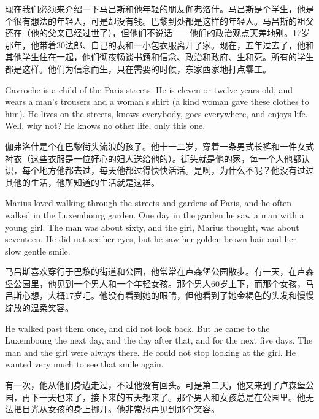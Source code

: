 \documentclass[fontset=ubuntu, zihao=5]{ctexart}
\begin{document}
\begin{paracol}{2}
\switchcolumn

现在我们必须来介绍一下马吕斯和他年轻的朋友伽弗洛什。马吕斯是个学生，他是个很有想法的年轻人，可是却没有钱。巴黎到处都是这样的年轻人。马吕斯的祖父还在（他的父亲已经过世了），但他们不说话——他们的政治观点天差地别。17岁那年，他带着30法郎、自己的表和一小包衣服离开了家。现在，五年过去了，他和其他学生住在一起，他们彻夜畅谈书籍和信念、政治和政府、生和死。所有的学生都是这样。他们为信念而生，只在需要的时候，东家西家地打点零工。

\switchcolumn*

Gavroche is a child of the Paris streets. He is eleven or twelve years old, and wears a man's trousers and a woman's shirt (a kind woman gave these clothes to him). He lives on the streets, knows everybody, goes everywhere, and enjoys life. Well, why not? He knows no other life, only this one.

\switchcolumn

伽弗洛什是个在巴黎街头流浪的孩子。他十一二岁，穿着一条男式长裤和一件女式衬衣（这些衣服是一位好心的妇人送给他的）。街头就是他的家，每一个人他都认识，每个地方他都去过，每天他都过得快快活活。是啊，为什么不呢？他没有过过其他的生活，他所知道的生活就是这样。

\switchcolumn*

\sectionbreak

Marius loved walking through the streets and gardens of Paris, and he often walked in the Luxembourg garden. One day in the garden he saw a man with a young girl. The man was about sixty, and the girl, Marius thought, was about seventeen. He did not see her eyes, but he saw her golden-brown hair and her slow gentle smile.

\switchcolumn

\sectionbreak

马吕斯喜欢穿行于巴黎的街道和公园，他常常在卢森堡公园散步。有一天，在卢森堡公园里，他见到一个男人和一个年轻女孩。那个男人60岁上下，而那个女孩，马吕斯心想，大概17岁吧。他没有看到她的眼睛，但他看到了她金褐色的头发和慢慢绽放的温柔笑容。

\switchcolumn*

He walked past them once, and did not look back. But he came to the Luxembourg the next day, and the day after that, and for the next five days. The man and the girl were always there. He could not stop looking at the girl. He wanted very much to see that smile again.

\switchcolumn

有一次，他从他们身边走过，不过他没有回头。可是第二天，他又来到了卢森堡公园，再下一天也来了，接下来的五天都来了。那个男人和女孩总是在公园里。他无法把目光从女孩的身上挪开。他非常想再见到那个笑容。


\end{paracol}
\end{document}
